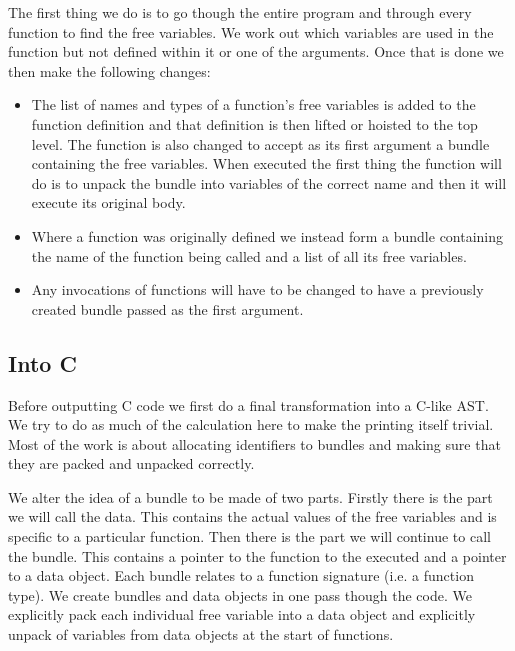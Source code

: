 \documentclass[a4paper]{article}
\begin{document}
The first thing we do is to go though the entire program and through every function to find the free variables. We work out which variables are used in the function but not defined within it or one of the arguments. Once that is done we then make the following changes:
\begin{itemize}
\item
	The list of names and types of a function's free variables is added to the function definition and that definition is then lifted or hoisted to the top level. The function is also changed to accept as its first argument a bundle containing the free variables. When executed the first thing the function will do is to unpack the bundle into variables of the correct name and then it will execute its original body.

\item
	Where a function was originally defined we instead form a bundle containing the name of the function being called and a list of all its free variables.

\item
	Any invocations of functions will have to be changed to have a previously created bundle passed as the first argument.

\end{itemize}




\subsection{Into C}

Before outputting C code we first do a final transformation into a C-like AST. We try to do as much of the calculation here to make the printing itself trivial. Most of the work is about allocating identifiers to bundles and making sure that they are packed and unpacked correctly.

We alter the idea of a bundle to be made of two parts. Firstly there is the part we will call the data. This contains the actual values of the free variables and is specific to a particular function. Then there is the part we will continue to call the bundle. This contains a pointer to the function to the executed and a pointer to a data object. Each bundle relates to a function signature (i.e. a function type). We create bundles and data objects in one pass though the code. We explicitly pack each individual free variable into a data object and explicitly unpack of variables from data objects at the start of functions.
\end{document}

